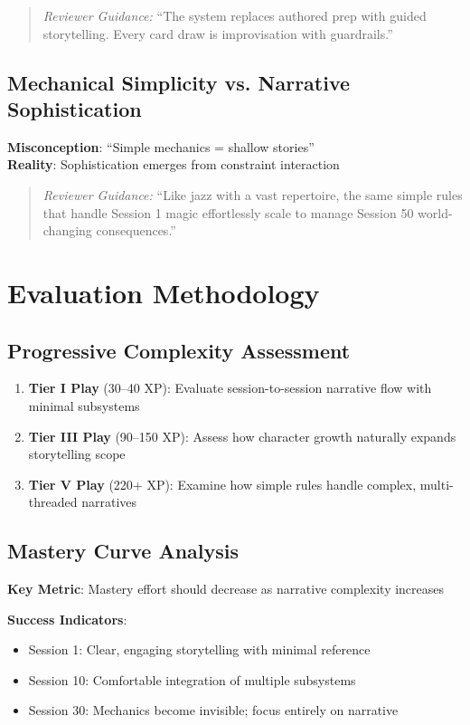 \documentclass[11pt]{article}
\begin{document}
\begin{quote}
\textit{Reviewer Guidance:} ``The system replaces authored prep with guided storytelling. Every card draw is improvisation with guardrails.''
\end{quote}

\subsection{Mechanical Simplicity vs. Narrative Sophistication}
\textbf{Misconception}: ``Simple mechanics = shallow stories'' \\
\textbf{Reality}: Sophistication emerges from constraint interaction

\begin{quote}
\textit{Reviewer Guidance:} ``Like jazz with a vast repertoire, the same simple rules that handle Session 1 magic effortlessly scale to manage Session 50 world-changing consequences.''
\end{quote}

\section{Evaluation Methodology}

\subsection{Progressive Complexity Assessment}
\begin{enumerate}
    \item \textbf{Tier I Play} (30–40 XP): Evaluate session-to-session narrative flow with minimal subsystems
    \item \textbf{Tier III Play} (90–150 XP): Assess how character growth naturally expands storytelling scope
    \item \textbf{Tier V Play} (220+ XP): Examine how simple rules handle complex, multi-threaded narratives
\end{enumerate}

\subsection{Mastery Curve Analysis}
\textbf{Key Metric}: Mastery effort should decrease as narrative complexity increases

\textbf{Success Indicators}:
\begin{itemize}
    \item Session 1: Clear, engaging storytelling with minimal reference
    \item Session 10: Comfortable integration of multiple subsystems
    \item Session 30: Mechanics become invisible; focus entirely on narrative
\end{itemize}
\end{document}
